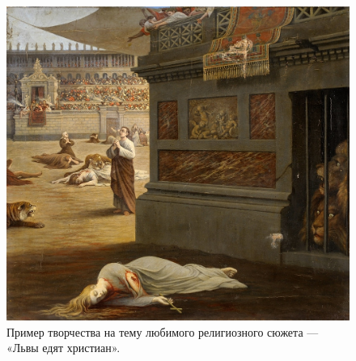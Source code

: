 \begin{figure}[h!tb]
	\centering\includegraphics[scale=0.35]{Relig_gambit/15729320001204595.png}
	
	\caption{Пример творчества  на тему любимого религиозного сюжета — «Львы едят христиан».}
	\label{fig:gambit21} %
	
\end{figure}
%	
%
%	
%	
%	
